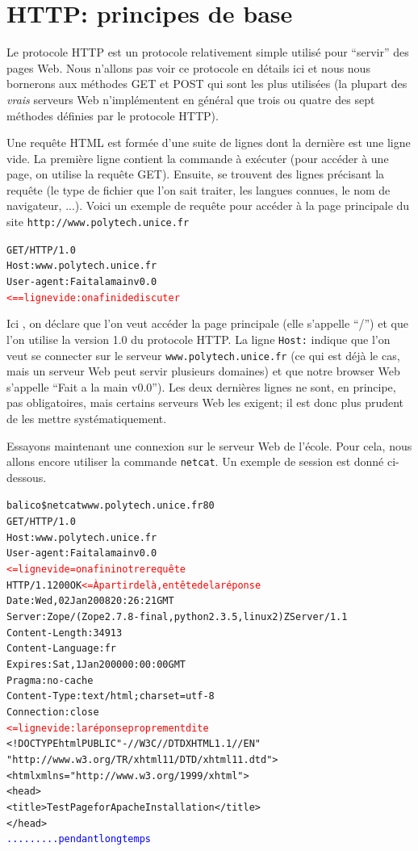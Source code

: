 \documentclass[10pt,a4paper]{article}
\begin{document}
\section*{HTTP: principes de base}

Le protocole HTTP est un protocole relativement simple utilisé pour
``servir'' des pages Web. Nous n'allons pas voir ce protocole en
détails ici et nous nous bornerons aux méthodes GET et POST qui sont les plus
utilisées (la plupart des \emph{vrais} serveurs Web n'implémentent en
général que trois ou quatre des sept méthodes définies par le protocole HTTP).


Une requête HTML est formée d'une suite de lignes dont la dernière
est une ligne vide. La première ligne contient la commande à exécuter
(pour accéder à une page, on utilise la requête GET). Ensuite, se
trouvent des lignes précisant la requête (le type de fichier que l'on
sait traiter, les langues connues, le nom de navigateur, ...). Voici
un exemple de requête pour accéder à la page principale du site
\texttt{http://www.polytech.unice.fr}
\begin{alltt}
    GET / HTTP/1.0
    Host: www.polytech.unice.fr
    User-agent: Fait a la main v0.0
              \textcolor{red}{<== ligne vide: on a fini de discuter}
\end{alltt}

Ici , on déclare que l'on veut accéder la page principale (elle
s'appelle ``/'') et que l'on utilise la version 1.0 du protocole
HTTP.  La ligne \texttt{Host:} indique que l'on veut se connecter sur le
serveur \texttt{www.polytech.unice.fr} (ce qui est déjà le cas, mais
un serveur Web peut servir plusieurs domaines) et que notre browser Web
s'appelle ``Fait a la main v0.0''). Les deux dernières lignes ne sont,
en principe, pas obligatoires, mais certains serveurs Web les
exigent; il est donc plus prudent de les mettre systématiquement.

Essayons maintenant une connexion sur le serveur Web de l'école. Pour
cela, nous allons encore utiliser la commande \texttt{netcat}. Un
exemple de session est donné ci-dessous.

\begin{alltt}
    balico\$ netcat www.polytech.unice.fr 80
    GET / HTTP/1.0
    Host: www.polytech.unice.fr
    User-agent: Fait a la main v0.0
                            \textcolor{red}{<= ligne vide = on a fini notre requête}
    HTTP/1.1 200 OK         \textcolor{red}{<= À partir de là, entête de la réponse}
    Date: Wed, 02 Jan 2008 20:26:21 GMT
    Server: Zope/(Zope 2.7.8-final, python 2.3.5, linux2) ZServer/1.1
    Content-Length: 34913
    Content-Language: fr
    Expires: Sat, 1 Jan 2000 00:00:00 GMT
    Pragma: no-cache
    Content-Type: text/html;charset=utf-8
    Connection: close
                            \textcolor{red}{<= ligne vide: la réponse proprement dite}
    <!DOCTYPE html PUBLIC "-//W3C//DTD XHTML 1.1//EN"
                    "http://www.w3.org/TR/xhtml11/DTD/xhtml11.dtd">
    <html xmlns="http://www.w3.org/1999/xhtml">
            <head>
                    <title>Test Page for Apache Installation</title>
            </head>
    \textcolor{blue}{.........  pendant longtemps}
\end{alltt}
\end{document}
